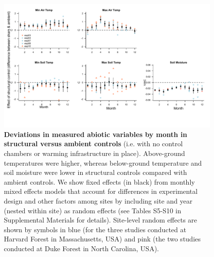 \documentclass{article}
\begin{document}
 
 \begin{figure}[p]
\centering
 \includegraphics{../Analyses/figures/ShamVSAmbient_all.pdf}  
 \caption{\textbf{Deviations in measured abiotic variables by month in structural versus ambient controls} (i.e. with no control chambers or warming infrastructure in place). Above-ground temperatures were higher, whereas below-ground temperature and soil moisture were lower in structural controls compared with ambient controls. We show fixed effects (in black) from monthly mixed effects models that account for differences in experimental design and other factors among sites by including site and year (nested within site) as random effects (see Tables S5-S10 in Supplemental Materials for details). Site-level random effects are shown by symbols in blue (for the three studies conducted at Harvard Forest in Massachusetts, USA) and pink (the two studies conducted at Duke Forest in North Carolina, USA).}
 \label{fig:shamamb}
 \end{figure}
\clearpage
\end{document}
